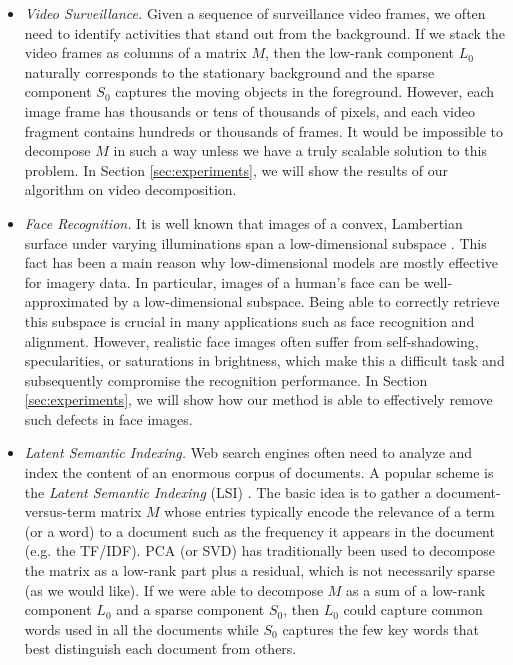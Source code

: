 \begin{itemize}
\item {\em Video Surveillance.} Given a sequence of surveillance video frames, we often need to identify activities that stand out from the background. If we stack the video frames as columns of a matrix $M$, then the low-rank component $L_0$ naturally corresponds to the stationary background and the sparse component $S_0$ captures the moving objects in the foreground. However, each image frame has thousands or tens of thousands of pixels, and each video fragment contains hundreds or thousands of frames. It would be impossible to decompose $M$ in such a way unless we have a truly scalable solution to this problem. In Section \ref{sec:experiments}, we will show the results of our algorithm on video decomposition.

\item {\em Face Recognition.} It is well known that images of a convex, Lambertian surface under varying illuminations span a low-dimensional subspace \cite{Basri2003-PAMI}. This fact has been a main reason why low-dimensional models are mostly effective for imagery data. In particular, images of a human's face can be well-approximated by a low-dimensional subspace. Being able to correctly retrieve this subspace is crucial in many applications such as face recognition and alignment. However, realistic face images often suffer from self-shadowing, specularities, or saturations in brightness, which make this a difficult task and subsequently compromise the recognition performance. In Section
  \ref{sec:experiments}, we will show how our method is able to effectively remove such defects in face images.

\item {\em Latent Semantic Indexing.} Web search engines often need to analyze and index the content of an enormous corpus of documents. A popular scheme is the {\em Latent Semantic Indexing} (LSI) \cite{Dewester1990-JSIS,Papadimitriou}. The basic idea is to gather a document-versus-term matrix $M$ whose entries typically encode the relevance of a term (or a word) to a document such as the frequency it appears in the document (e.g. the TF/IDF). PCA (or SVD) has traditionally been used to decompose the matrix as a low-rank part plus a residual, which is not necessarily sparse (as we would like). If we were able to decompose $M$ as a sum of a low-rank component $L_0$ and a sparse component $S_0$, then $L_0$ could capture common words used in all the documents while $S_0$ captures the few key words that best distinguish each document from others.


\end{itemize}
